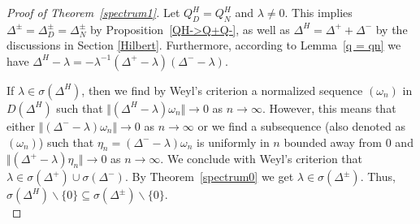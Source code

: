 \documentclass[10pt]{amsart}
\theoremstyle{definition}
\begin{document}
\begin{proof}[Proof of Theorem~\ref{spectrum1}]
Let $Q^H_{D}=Q^H_N$ and $\lambda\neq 0.$ This implies $\Delta^{\pm}=\Delta^{\pm}_{D}=\Delta_{N}^{\pm}$ by Proposition~\ref{QH->Q+Q-}, as well as $\Delta^H = \Delta^++\Delta^-$ by the discussions in Section \ref{Hilbert}. Furthermore, according to Lemma~\ref{q = qn} we have $\Delta^H -\lambda= -\lambda^{-1}(\Delta^+-\lambda)(\Delta^--\lambda).$ 

If $\lambda\in\sigma(\Delta^H)$, then we find by Weyl's criterion a normalized sequence $(\omega_n)$ in $D(\Delta^H)$ such that $\Vert(\Delta^H-\lambda)\omega_n\Vert\rightarrow 0$ as $n\rightarrow\infty.$ However, this means that either $\Vert(\Delta^--\lambda)\omega_n\Vert\rightarrow 0$ as $n\rightarrow\infty$ or we find a subsequence (also denoted as $(\omega_n)$) such that $\eta_n = (\Delta^--\lambda)\omega_{n}$ is uniformly in $n$ bounded away from $0$ and $\Vert(\Delta^+-\lambda)\eta_n\Vert\rightarrow 0$ as $n\rightarrow\infty.$ We conclude with Weyl's criterion that $\lambda\in\sigma(\Delta^+)\cup\sigma(\Delta^-).$ By Theorem~\ref{spectrum0} we get $\lambda\in\sigma(\Delta^\pm).$ Thus, $\sigma(\Delta^H)\backslash\lbrace 0\rbrace\subseteq\sigma(\Delta^\pm)\backslash\lbrace 0\rbrace.$\\


\end{proof}
\end{document}
